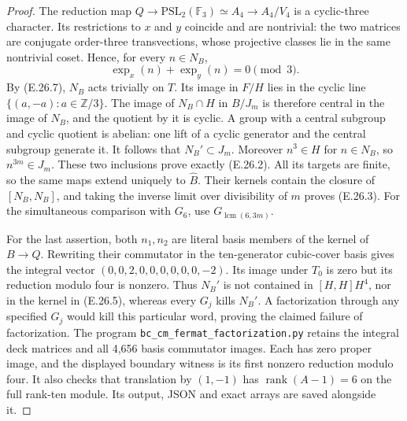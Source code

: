 \begin{proof}
The reduction map
$Q\to\mathrm{PSL}_2(\mathbb F_3)\simeq A_4\to A_4/V_4$
is a cyclic-three character.  Its restrictions to $x$ and $y$
coincide and are nontrivial: the two matrices are conjugate
order-three transvections, whose projective classes lie in
the same nontrivial coset.  Hence, for every $n\in N_B$,
\[
        \operatorname{exp}_x(n)+\operatorname{exp}_y(n)=0
                    \pmod3.
 \tag{E.26.8}
\]
By (E.26.7), $N_B$ acts trivially on $T$.  Its image in
$F/H$ lies in the cyclic line $\{(a,-a):a\in\mathbb Z/3\}$.
The image of $N_B\cap H$ in $B/J_m$ is therefore central
in the image of $N_B$, and the quotient by it is cyclic.
A group with a central subgroup and cyclic quotient is
abelian: one lift of a cyclic generator and the central
subgroup generate it.  It follows that $N_B'\subset J_m$.
Moreover $n^3\in H$ for $n\in N_B$, so $n^{3m}\in J_m$.
These two inclusions prove exactly (E.26.2).  All its targets
are finite, so the same maps extend uniquely to $\widehat B$.
Their kernels contain the closure of $[N_B,N_B]$, and taking
the inverse limit over divisibility of $m$ proves (E.26.3).
For the simultaneous comparison
with $G_6$, use $G_{\operatorname{lcm}(6,3m)}$.

For the last assertion, both $n_1,n_2$ are literal basis
members of the kernel of $B\to Q$.  Rewriting their
commutator in the ten-generator cubic-cover basis gives
the integral vector $(0,0,2,0,0,0,0,0,0,-2)$.
Its image under $T_0$ is zero but its reduction modulo four
is nonzero.  Thus $N_B'$ is not contained in $[H,H]H^4$,
nor in the kernel in (E.26.5), whereas every $G_j$ kills
$N_B'$.  A factorization through any specified $G_j$
would kill this particular word, proving the claimed
failure of factorization.
The program \texttt{bc\_cm\_fermat\_factorization.py}
retains the integral deck matrices and all 4,656 basis
commutator images.  Each has zero proper image, and the
displayed boundary witness is its first nonzero reduction
modulo four.  It also checks that translation by $(1,-1)$
has $\operatorname{rank}(A-1)=6$ on the full rank-ten module.
Its output, JSON and exact arrays are saved alongside it.
\end{proof}
